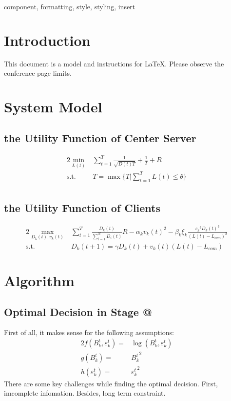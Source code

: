 \documentclass[conference]{IEEEtran}
\makeatletter
\newcommand{\Rmnum}[1]{\expandafter\@slowromancap\romannumeral #1@}
\makeatother
\begin{document}
\begin{IEEEkeywords}
component, formatting, style, styling, insert
\end{IEEEkeywords}

\section{Introduction}
This document is a model and instructions for \LaTeX.
Please observe the conference page limits. 

\section{System Model}
\subsection{the Utility Function of Center Server}
\begin{alignat}{2}
    \mathop{\min}_{L(t)} & \sum_{t=1}^{T} \frac{1}{\sqrt{D(t)T}} + \frac{1}{T} + R \\
    \text{s.t.} & T = \max\{T | \sum_{t=1}^{T} L(t) \le \theta\} \\
\end{alignat}
\subsection{the Utility Function of Clients}
\begin{alignat}{2}
    \mathop{\max}_{D_k(t), v_k(t)} & \sum_{t=1}^{T} \frac{D_k(t)}{\sum_{i=1}^{N} D_i(t)} R - \alpha_k {v_k(t)}^2 - \beta_k {\xi_k\frac{{c_k}^3{D_k(t)}^3}{(L(t) - L_{com})^2}} \\
    \text{s.t.} & D_k(t + 1) = \gamma D_k(t) + v_k(t)(L(t) - L_{com})
\end{alignat}

\section{Algorithm}

\subsection{Optimal Decision in Stage \Rmnum{2}}
First of all, it makes sense for the following assumptions:
\begin{alignat}{2}
    f(B_k^t, \varepsilon_k^t) = & \log(B_k^t, \varepsilon_k^t) \\
    g(B_k^t) = & {B_k^t}^2 \\
    h(\varepsilon_k^t) = & {\varepsilon_k^t}^2
\end{alignat}
There are some key challenges while finding the optimal decision.
First, imcomplete infomation.
Besides, long term constraint.
\end{document}
